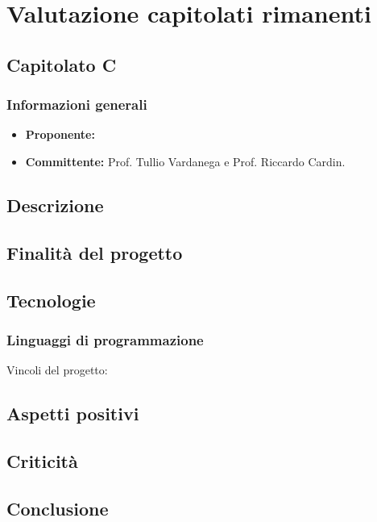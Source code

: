 \documentclass{article}
\begin{document}
\section{Valutazione capitolati rimanenti}
    \subsection{Capitolato C}
       \subsubsection{Informazioni generali}
       \begin{itemize}
           \item \textbf{Proponente: }
           \item \textbf{Committente: }Prof. Tullio Vardanega e Prof. Riccardo Cardin.
       \end{itemize}

    \subsection{Descrizione}
       
    \subsection{Finalità del progetto}
      
    \subsection{Tecnologie}
    
        \subsubsection{Linguaggi di programmazione}
      
    Vincoli del progetto:
    
    
    \subsection{Aspetti positivi}
    
    \subsection{Criticità}
    
    \subsection{Conclusione}
\end{document}
